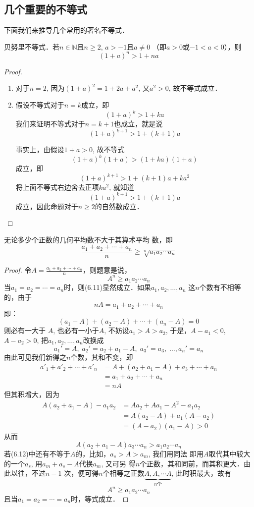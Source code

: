 \subsection{几个重要的不等式}
下面我们来推导几个常用的著名不等式．


\begin{example}
    贝努里不等式．若$n\in\mathbb{N}$且$n\ge 2$, $a>-1$且$a\ne 0$
（即$a>0$或$-1<a<0$），则
\[(1+a)^n>1+na\]
\end{example}


\begin{proof}
\begin{enumerate}
    \item 对于$n=2$, 因为$(1+a)^2=1+2a+a^2$, 又$a^2>0$, 故不等式成立．
\item 假设不等式对于$n=k$成立，即
\[(1+a)^k>1+ka\]
我们来证明不等式对于$n=k+1$也成立，就是说
\[(1+a)^{k+1}>1+(k+1)a\]

事实上，由假设$1+a>0$, 故不等式
\[(1+a)^k(1+a)>(1+ka)(1+a)\]
成立，即
\[(1+a)^{k+1}>1+(k+1)a+ka^2\]
将上面不等式右边舍去正项$ka^2$, 就知道
\[(1+a)^{k+1}>1+(k+1)a\]
成立，因此命题对于$n\ge 2$的自然数成立．
\end{enumerate}
\end{proof}

\begin{example}
    无论多少个正数的几何平均数不大于其算术平均
数，即
\[\frac{a_1+a_2+\cdots+a_n}{n}\ge \sqrt[n]{a_1a_2\cdots a_n}\]
\end{example}

\begin{proof}
令$A=\frac{a_1+a_2+\cdots+a_n}{n}$，则题意是说，
\begin{equation}
    A^n\ge a_1a_2\cdots a_n
\end{equation}
当$a_1=a_2=\cdots= a_n$时，则(6.11)显然成立．如果$a_1,a_2,\ldots,a_n$
这$n$个数有不相等的，由于
    \[nA=a_1+a_2+\cdots+a_n\]
即：
\[(a_1-A)+(a_2-A)+\cdots+(a_n-A)=0\]
则必有一大于
$A$, 也必有一小于$A$, 不妨设$a_1>A>a_2$, 于是，$A-a_1<0$,
$A-a_2>0$, 把$a_1,a_2,\ldots,a_n$改换成
\begin{equation}
a_1'=A,\; a_2'=a_2+a_1-A,\; a_3'=a_3,\; \ldots, a_n'=a_n
\end{equation}
由此可见我们新得之$n$个数，其和不变，即
\[\begin{split}
    a'_1+a'_2+\cdots +a'_n&=A+(a_2+a_1-A)+a_3+\cdots +a_n\\
&= a_1+a_2+\cdots +a_n\\
&=nA
\end{split}\]
但其积增大，因为
\[\begin{split}
    A(a_2+a_1-A)-a_1a_2&=Aa_2+Aa_1-A^2-a_1a_2\\
&=A(a_2-A)+a_1(A-a_2)\\
&=(A-a_2)(a_1-A)>0
\end{split}\]
从而
\[A(a_2+a_1-A)a_3\cdots a_n>a_1a_2\cdots a_n\]
若(6.12)中还有不等于$A$的，比如，$a_s>A>a_m$, 我们用同法
即用$A$取代其中较大的一个$a_s$, 用$a_m+a_s-A$代换$a_m$, 又可另
得$n$个正数，其和同前，而其积更大．由此以往，不过$n-1$
次，便可得$n$个相等之正数$\underbrace{A,A,\cdots A}_{\text{$n$个}}$, 此时积最大，故有
\[A^n\ge a_1a_2\cdots a_n\]
且当$a_1=a_2=\cdots =a_n$时，等式成立．
\end{proof}

